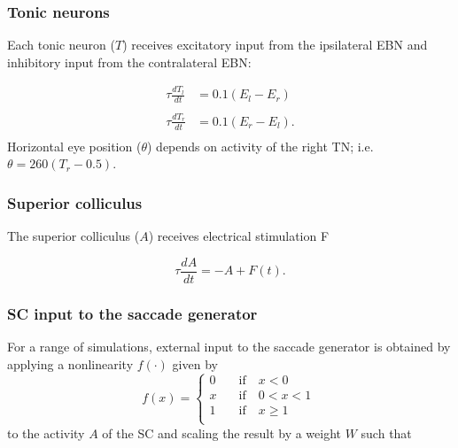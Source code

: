 \documentclass[10pt,a4paper,onecolumn]{article}
\begin{document}
\subsubsection{Tonic neurons}\label{tonic-neurons}

Each tonic neuron (\(T\)) receives excitatory input from the ipsilateral
EBN and inhibitory input from the contralateral EBN:

\begin{equation}
\begin{array}{ll}
\tau\frac{dT_l}{dt} &= 0.1(E_l-E_r) \\\\
\tau\frac{dT_r}{dt} &= 0.1(E_r-E_l) \textrm{.} \\
\end{array}
\label{eq:tn}\end{equation} Horizontal eye position (\(\theta\)) depends
on activity of the right TN; i.e. \(\theta = 260(T_r-0.5)\).

\subsubsection{Superior colliculus}\label{superior-colliculus}

The superior colliculus (\(A\)) receives electrical stimulation F

\begin{equation}
\tau \frac{dA}{dt} =-A+F(t) \textrm{.}
\label{eq:sc}\end{equation}

\subsubsection{SC input to the saccade
generator}\label{sc-input-to-the-saccade-generator}

For a range of simulations, external input to the saccade generator is
obtained by applying a nonlinearity \(f(\cdot)\) given by
\begin{equation}
f(x) = 
\left\{
 \begin{array}{lll}
    0 \quad &\textrm{if} \quad x<0 \\
    x \quad &\textrm{if} \quad 0<x<1 \\
    1 \quad &\textrm{if} \quad x \geq 1 \\
  \end{array}
\right.\
\label{eq:pw}\end{equation} to the activity \(A\) of the SC and scaling
the result by a weight \(W\) such that
\end{document}
